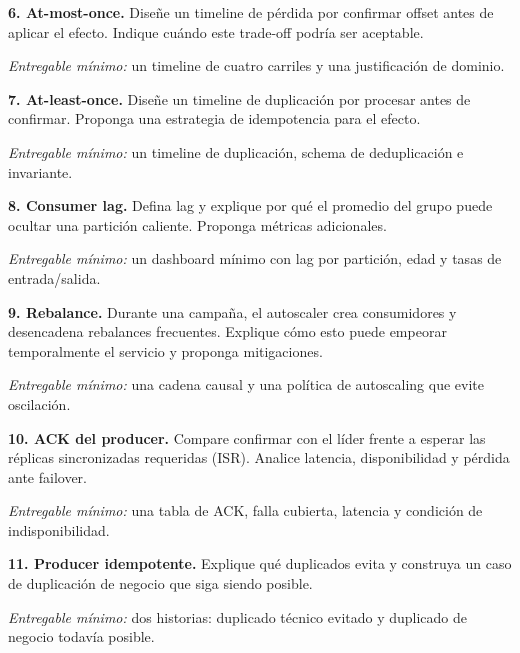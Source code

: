 \documentclass[variant=guia,cover=institutional,mode=screen]{ua-engineering-v6-article}
\begin{document}
\begin{uaexercise}

\textbf{6. At-most-once.} Diseñe un timeline de pérdida por confirmar offset antes de aplicar el efecto. Indique cuándo este trade-off podría ser aceptable.

\textit{Entregable mínimo:} un timeline de cuatro carriles y una justificación de dominio.
\end{uaexercise}
\begin{uaexercise}

\textbf{7. At-least-once.} Diseñe un timeline de duplicación por procesar antes de confirmar. Proponga una estrategia de idempotencia para el efecto.

\textit{Entregable mínimo:} un timeline de duplicación, schema de deduplicación e invariante.
\end{uaexercise}
\begin{uaexercise}

\textbf{8. Consumer lag.} Defina lag y explique por qué el promedio del grupo puede ocultar una partición caliente. Proponga métricas adicionales.

\textit{Entregable mínimo:} un dashboard mínimo con lag por partición, edad y tasas de entrada/salida.
\end{uaexercise}
\begin{uaexercise}

\textbf{9. Rebalance.} Durante una campaña, el autoscaler crea consumidores y desencadena rebalances frecuentes. Explique cómo esto puede empeorar temporalmente el servicio y proponga mitigaciones.

\textit{Entregable mínimo:} una cadena causal y una política de autoscaling que evite oscilación.
\end{uaexercise}
\begin{uaexercise}

\textbf{10. ACK del producer.} Compare confirmar con el líder frente a esperar las réplicas sincronizadas requeridas (ISR). Analice latencia, disponibilidad y pérdida ante failover.

\textit{Entregable mínimo:} una tabla de ACK, falla cubierta, latencia y condición de indisponibilidad.
\end{uaexercise}
\begin{uaexercise}

\textbf{11. Producer idempotente.} Explique qué duplicados evita y construya un caso de duplicación de negocio que siga siendo posible.

\textit{Entregable mínimo:} dos historias: duplicado técnico evitado y duplicado de negocio todavía posible.
\end{uaexercise}
\end{document}
